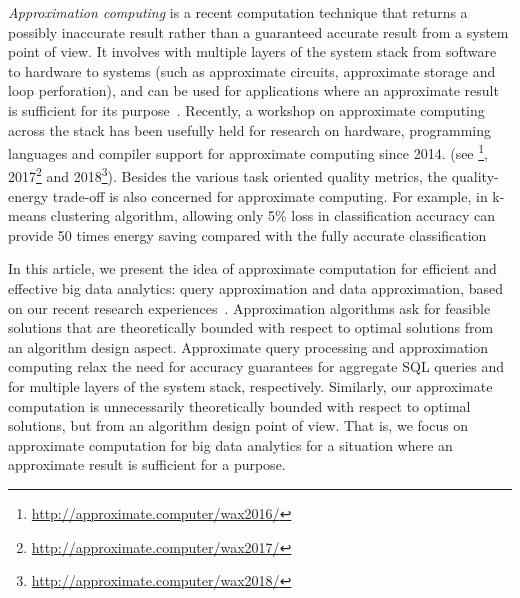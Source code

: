 \item[(3)] {\em Approximation computing} is a recent computation technique that returns a possibly inaccurate result rather than a guaranteed accurate result from a system point of view.  It involves with multiple layers of the system stack from software to hardware to systems (such as approximate circuits, approximate storage and loop perforation), and can be used for applications where an approximate result is sufficient for its purpose~\cite{AgrawalCGGNOPSS16,Mittal16b}. Recently, a workshop on approximate computing across the stack has been usefully held for research on hardware, programming languages and compiler support  for approximate computing  since 2014.  (see \footnote{\small \url{http://approximate.computer/wax2016/}}, 2017\footnote{\small  \url{http://approximate.computer/wax2017/}} and 2018\footnote{\small \url{http://approximate.computer/wax2018/}}). Besides the various task oriented quality metrics,  the quality-energy trade-off is also  concerned for approximate computing. For example, in k-means clustering algorithm, allowing only 5\% loss in classification accuracy can provide 50 times energy saving compared with the fully accurate classification~\cite{Mittal16b}
\ei

In this article, we present the idea of approximate computation for efficient and effective big data analytics: query approximation and data approximation, based on our recent research experiences~\cite{MaCHW12,ShuaiMaVLDB12,tods-MaCFHW14,LinMZWH17,MaHWLH17,MaFLWCH16,MaFLWCH17,HuAMH16,DuanAMHH16,DuanMAMH17,rankicde2018}.
Approximation algorithms ask for feasible solutions that are theoretically bounded with respect to optimal solutions from an algorithm design aspect.
Approximate query processing and approximation computing relax the need for accuracy guarantees for aggregate SQL queries and for multiple layers of the system stack, respectively. Similarly, our approximate computation is unnecessarily theoretically bounded with respect to optimal solutions, but from an algorithm design point of view. That is, we focus on approximate computation for big data analytics for a situation where an approximate result is sufficient for a purpose.





